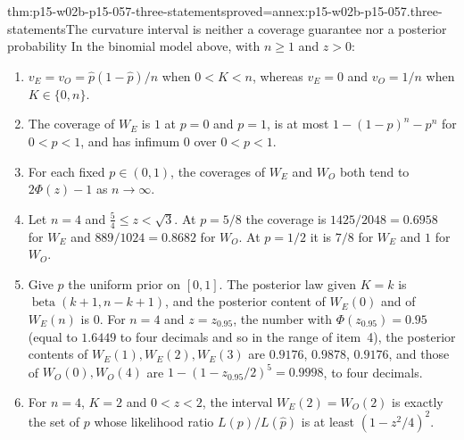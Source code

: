 \begin{hbtheorem}{thm:p15-w02b-p15-057-three-statements}{proved=annex:p15-w02b-p15-057.three-statements}{The curvature interval is neither a coverage guarantee nor a posterior probability}
In the binomial model above, with \(n\geq1\) and \(z>0\):
\begin{enumerate}
\item \(v_E=v_O=\hat p(1-\hat p)/n\) when \(0<K<n\), whereas \(v_E=0\) and
 \(v_O=1/n\) when \(K\in\{0,n\}\).
\item The coverage of \(W_E\) is \(1\) at \(p=0\) and \(p=1\), is at most
 \(1-(1-p)^n-p^n\) for \(0<p<1\), and has infimum \(0\) over \(0<p<1\).
\item For each fixed \(p\in(0,1)\), the coverages of \(W_E\) and \(W_O\)
 both tend to \(2\Phi(z)-1\) as \(n\to\infty\).
\item Let \(n=4\) and \(\tfrac54\leq z<\sqrt3\). At \(p=5/8\) the coverage
 is \(1425/2048=0.6958\) for \(W_E\) and \(889/1024=0.8682\) for \(W_O\).
 At \(p=1/2\) it is \(7/8\) for \(W_E\) and \(1\) for \(W_O\).
\item Give \(p\) the uniform prior on \([0,1]\). The posterior law given
 \(K=k\) is \(\operatorname{beta}(k+1,n-k+1)\), and the posterior content
 of \(W_E(0)\) and of \(W_E(n)\) is \(0\). For \(n=4\) and \(z=z_{0.95}\),
 the number with \(\Phi(z_{0.95})=0.95\) (equal to \(1.6449\) to four
 decimals and so in the range of item~4), the posterior contents of
 \(W_E(1),W_E(2),W_E(3)\) are \(0.9176\), \(0.9878\), \(0.9176\), and those
 of \(W_O(0),W_O(4)\) are \(1-(1-z_{0.95}/2)^5=0.9998\), to four decimals.
\item For \(n=4\), \(K=2\) and \(0<z<2\), the interval \(W_E(2)=W_O(2)\) is
 exactly the set of \(p\) whose likelihood ratio \(L(p)/L(\hat p)\) is at
 least \((1-z^2/4)^2\).
\end{enumerate}
\end{hbtheorem}

